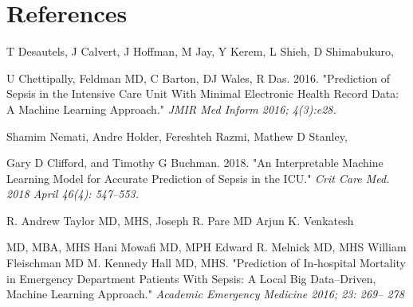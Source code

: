 \documentclass[12pt, letterpaper]{article}
\begin{document}
\section{References \\}
T Desautels, J Calvert, J Hoffman, M Jay, Y Kerem, L Shieh, D Shimabukuro, 
\begin{adjustwidth}{2.5em}{0pt}
U Chettipally, Feldman MD, C Barton, DJ Wales, R Das. 2016. "Prediction of Sepsis in the Intensive Care Unit With Minimal Electronic Health Record Data: A Machine Learning Approach." \textit{JMIR Med Inform 2016; 4(3):e28.} \\
\end{adjustwidth}
Shamim Nemati, Andre Holder, Fereshteh Razmi, Mathew D Stanley, 
\begin{adjustwidth}{2.5em}{0pt}
Gary D Clifford, and Timothy G Buchman. 2018. "An Interpretable Machine Learning Model for Accurate Prediction of Sepsis in the ICU." \textit{Crit Care Med. 2018 April 46(4): 547–553.} \\
\end{adjustwidth}
R. Andrew Taylor MD, MHS, Joseph R. Pare MD Arjun K. Venkatesh 
\begin{adjustwidth}{2.5em}{0pt}
MD, MBA, MHS Hani Mowafi MD, MPH Edward R. Melnick MD, MHS William Fleischman MD M. Kennedy Hall MD, MHS. "Prediction of In‐hospital Mortality in Emergency Department Patients With Sepsis: A Local Big Data–Driven, Machine Learning Approach." \textit{Academic Emergency Medicine 2016; 23: 269– 278} \\
\end{adjustwidth}
\end{document}
